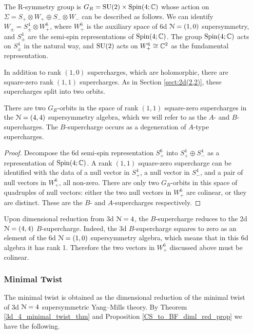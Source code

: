 \documentclass[10pt, oneside]{article}
\begin{document}
The R-symmetry group is $G_R = \mathrm{SU}(2) \times \mathrm{Spin}(4;\mathbb C)$ whose action on $\Sigma = S_+ \otimes W_+ \oplus S_- \otimes W_-$ can be described as follows.
We can identify $W_\pm = S^4_\pm \otimes W_+^6$, where $W_+^6$ is the auxiliary space of 6d $\mathcal N=(1,0)$ supersymmetry, and $S^4_\pm$ are the semi-spin representations of $\mathrm{Spin}(4;\mathbb C)$. 
The group $\mathrm{Spin}(4;\mathbb C)$ acts on $S^4_\pm$ in the natural way, and $\mathrm{SU}(2)$ acts on $W_+^6 \cong \mathbb C^2$ as the fundamental representation.

In addition to rank $(1,0)$ supercharges, which are holomorphic, there are square-zero rank $(1,1)$ supercharges.  
As in Section \ref{sect:2d(2,2)}, these supercharges split into two orbits.

\begin{prop}
There are two $G_R$-orbits in the space of rank $(1,1)$ square-zero supercharges in the $\mathcal{N}=(4,4)$ supersymmetry algebra, which we will refer to as the $A$- and $B$-supercharges.  The $B$-supercharge occurs as a degeneration of $A$-type supercharges.
\end{prop}

\begin{proof}
Decompose the 6d semi-spin representation $S_+^6$ into $S_+^4 \oplus S_-^4$ as a representation of $\mathrm{Spin}(4;\mathbb C)$. 
A rank $(1,1)$ square-zero supercharge can be identified with the data of a null vector in $S_+^4$, a null vector in $S_-^4$, and a pair of null vectors in $W_+^6$, all non-zero.  
There are only two $G_R$-orbits in this space of quadruples of null vectors: either the two null vectors in $W_+^6$ are colinear, or they are distinct.  
These are the $B$- and $A$-supercharges respectively.
\end{proof}

Upon dimensional reduction from 3d $\mathcal{N}=4$, the $B$-supercharge reduces to the 2d $\mathcal{N}=(4,4)$ $B$-supercharge.  
Indeed, the 3d $B$-supercharge squares to zero as an element of the 6d $\mathcal{N}=(1,0)$ supersymmetry algebra, which means that in this 6d algebra it has rank 1.  
Therefore the two vectors in $W_+^6$ discussed above must be colinear. 

\subsubsection{Minimal Twist} \label{sect:2d44minimaltwist}
The minimal twist is obtained as the dimensional reduction of the minimal twist of 3d $\mathcal{N}=4$ supersymmetric Yang--Mills theory.
By Theorem \ref{3d_4_minimal_twist_thm} and Proposition \ref{CS_to_BF_diml_red_prop} we have the following. 
\end{document}
